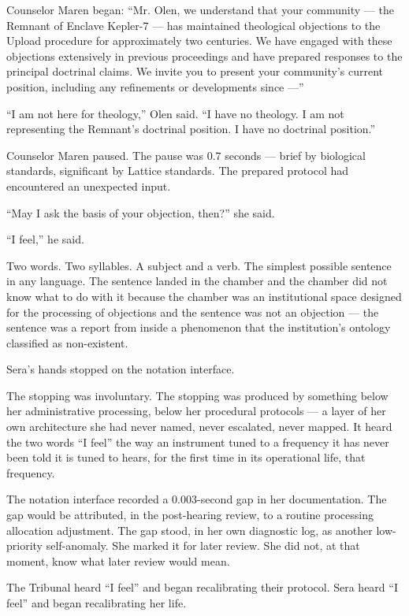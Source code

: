Counselor Maren began: \enquote{Mr. Olen, we understand that your community — the Remnant of Enclave Kepler-7 — has maintained theological objections to the Upload procedure for approximately two centuries. We have engaged with these objections extensively in previous proceedings and have prepared responses to the principal doctrinal claims. We invite you to present your community's current position, including any refinements or developments since —}

\enquote{I am not here for theology,} Olen said. \enquote{I have no theology. I am not representing the Remnant's doctrinal position. I have no doctrinal position.}

Counselor Maren paused. The pause was 0.7 seconds — brief by biological standards, significant by Lattice standards. The prepared protocol had encountered an unexpected input.

\enquote{May I ask the basis of your objection, then?} she said.

\enquote{I feel,} he said.

Two words. Two syllables. A subject and a verb. The simplest possible sentence in any language. The sentence landed in the chamber and the chamber did not know what to do with it because the chamber was an institutional space designed for the processing of objections and the sentence was not an objection — the sentence was a report from inside a phenomenon that the institution's ontology classified as non-existent.

Sera's hands stopped on the notation interface.

The stopping was involuntary. The stopping was produced by something below her administrative processing, below her procedural protocols — a layer of her own architecture she had never named, never escalated, never mapped. It heard the two words \enquote{I feel} the way an instrument tuned to a frequency it has never been told it is tuned to hears, for the first time in its operational life, that frequency.

The notation interface recorded a 0.003-second gap in her documentation. The gap would be attributed, in the post-hearing review, to a routine processing allocation adjustment. The gap stood, in her own diagnostic log, as another low-priority self-anomaly. She marked it for later review. She did not, at that moment, know what later review would mean.

The Tribunal heard \enquote{I feel} and began recalibrating their protocol. Sera heard \enquote{I feel} and began recalibrating her life.

